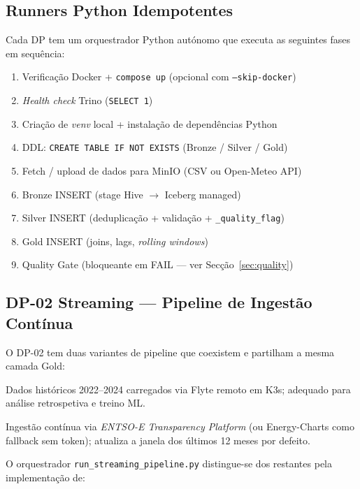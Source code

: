 \documentclass[11pt,a4paper]{article}
\begin{document}
\subsection{Runners Python Idempotentes}

Cada DP tem um orquestrador Python autónomo que executa as seguintes fases em sequência:

\begin{enumerate}[leftmargin=*,noitemsep]
  \item Verificação Docker + \texttt{compose up} (opcional com \texttt{--skip-docker})
  \item \textit{Health check} Trino (\texttt{SELECT 1})
  \item Criação de \textit{venv} local + instalação de dependências Python
  \item DDL: \texttt{CREATE TABLE IF NOT EXISTS} (Bronze / Silver / Gold)
  \item Fetch / upload de dados para MinIO (CSV ou Open-Meteo API)
  \item Bronze INSERT (stage Hive $\rightarrow$ Iceberg managed)
  \item Silver INSERT (deduplicação + validação + \texttt{\_quality\_flag})
  \item Gold INSERT (joins, lags, \textit{rolling windows})
  \item Quality Gate (bloqueante em FAIL --- ver Secção~\ref{sec:quality})
\end{enumerate}

\subsection{DP-02 Streaming --- Pipeline de Ingestão Contínua}

O DP-02 tem duas variantes de pipeline que coexistem e partilham a mesma camada Gold:

\begin{description}[leftmargin=*]
  \item[\textbf{Static (OMIE CSV)}] Dados históricos 2022--2024 carregados via Flyte remoto em K3s; adequado para análise retrospetiva e treino ML.
  \item[\textbf{Streaming (ENTSO-E API)}] Ingestão contínua via \textit{ENTSO-E Transparency Platform} (ou Energy-Charts como fallback sem token); atualiza a janela dos últimos 12 meses por defeito.
\end{description}

O orquestrador \texttt{run\_streaming\_pipeline.py} distingue-se dos restantes pela implementação de:
\end{document}
